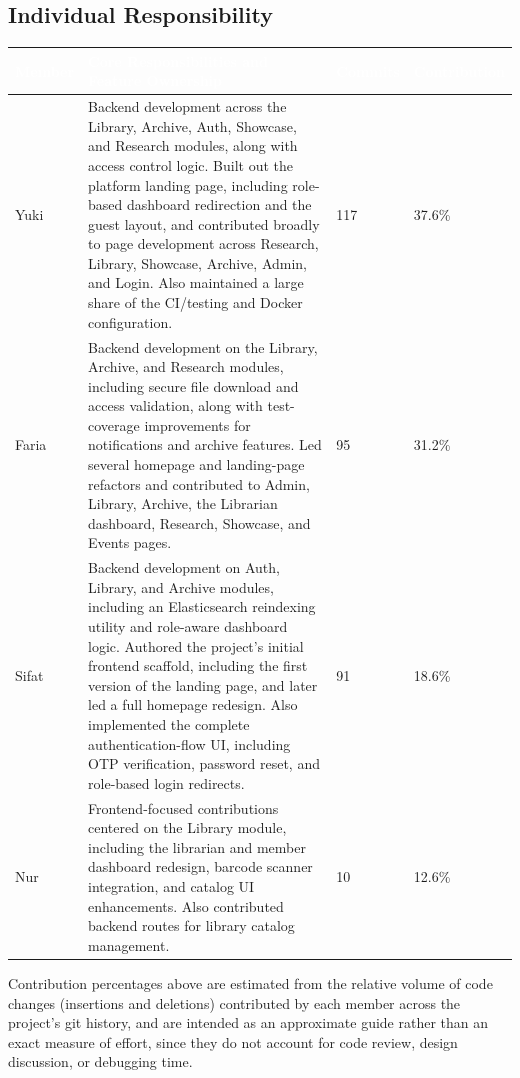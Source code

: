 \documentclass[12pt]{article}
\begin{document}
\subsection{Individual Responsibility}
\renewcommand{\arraystretch}{1.5}
\begin{longtable}{|L{2.1cm}|L{7.4cm}|L{2.4cm}|L{2.4cm}|}
\hline
{} \textcolor{white}{\bfseries Member} & \textcolor{white}{\bfseries Core Responsibilities and Feature Ownership} & \textcolor{white}{\bfseries Commits} & \textcolor{white}{\bfseries Contribution} \\
\hline
Yuki &
Backend development across the Library, Archive, Auth, Showcase, and Research modules, along with access control logic. Built out the platform landing page, including role-based dashboard redirection and the guest layout, and contributed broadly to page development across Research, Library, Showcase, Archive, Admin, and Login. Also maintained a large share of the CI/testing and Docker configuration. &
117 &
37.6\% \\
\hline
Faria &
Backend development on the Library, Archive, and Research modules, including secure file download and access validation, along with test-coverage improvements for notifications and archive features. Led several homepage and landing-page refactors and contributed to Admin, Library, Archive, the Librarian dashboard, Research, Showcase, and Events pages. &
95 &
31.2\% \\
\hline
Sifat &
Backend development on Auth, Library, and Archive modules, including an Elasticsearch reindexing utility and role-aware dashboard logic. Authored the project's initial frontend scaffold, including the first version of the landing page, and later led a full homepage redesign. Also implemented the complete authentication-flow UI, including OTP verification, password reset, and role-based login redirects. &
91 &
18.6\% \\
\hline
Nur &
Frontend-focused contributions centered on the Library module, including the librarian and member dashboard redesign, barcode scanner integration, and catalog UI enhancements. Also contributed backend routes for library catalog management. &
10 &
12.6\% \\
\hline
\end{longtable}

Contribution percentages above are estimated from the relative volume of code changes (insertions and deletions) contributed by each member across the project's git history, and are intended as an approximate guide rather than an exact measure of effort, since they do not account for code review, design discussion, or debugging time.
\end{document}
